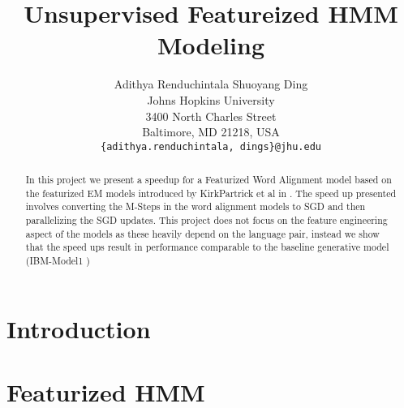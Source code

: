 \documentclass[11pt,letterpaper]{article}
\title{Unsupervised Featureized HMM Modeling}
\author{Adithya Renduchintala
  \quad\quad Shuoyang Ding\\
  Johns Hopkins University\\
  3400 North Charles Street\\
  Baltimore, MD 21218, USA\\
  {\tt \{adithya.renduchintala, dings\}@jhu.edu}}
\date{}
\begin{document}
\maketitle
\begin{abstract}
In this project we present a speedup for a Featurized Word Alignment model based on the featurized EM models introduced by KirkPartrick et al in \cite{berg2010painless}. The speed up presented involves converting the M-Steps in the word alignment models to SGD and then parallelizing the SGD updates. This project does not focus on the feature engineering aspect of the models as these heavily depend on the language pair, instead we show that the speed ups result in performance comparable to the baseline generative model (IBM-Model1 \cite{})
\end{abstract}

\section{Introduction}
\cite{brown1993mathematics}
\cite{vogel1996hmm}
\cite{berg2010painless}
\cite{baum1970maximization}

\section{Featurized HMM}
\end{document}
